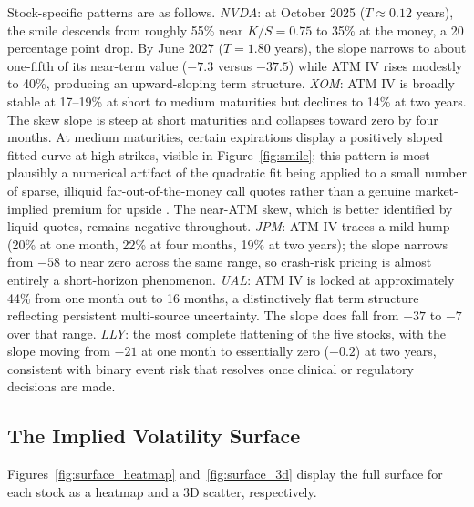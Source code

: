\documentclass[12pt, a4paper]{article}
\begin{document}
Stock-specific patterns are as follows. \textit{NVDA}: at October 2025 ($T \approx 0.12$
years), the smile descends from roughly 55\% near $K/S = 0.75$ to 35\% at the money, a
20 percentage point drop. By June 2027 ($T = 1.80$ years), the slope narrows to about
one-fifth of its near-term value ($-7.3$ versus $-37.5$) while ATM IV rises modestly to
40\%, producing an upward-sloping term structure. \textit{XOM}: ATM IV is broadly stable
at 17--19\% at short to medium maturities but declines to 14\% at two years. The skew
slope is steep at short maturities and collapses toward zero by four months. At medium
maturities, certain expirations display a positively sloped fitted curve at high strikes,
visible in Figure~\ref{fig:smile}; this pattern is most plausibly a numerical artifact
of the quadratic fit being applied to a small number of sparse, illiquid far-out-of-the-money
call quotes rather than a genuine market-implied premium for upside \citep{Jackwerth2000}.
The near-ATM skew, which is better identified by liquid quotes, remains negative throughout.
\textit{JPM}: ATM IV traces a mild hump (20\% at one month, 22\% at four months, 19\%
at two years); the slope narrows from $-58$ to near zero across the same range, so
crash-risk pricing is almost entirely a short-horizon phenomenon. \textit{UAL}: ATM IV
is locked at approximately 44\% from one month out to 16 months, a distinctively flat
term structure reflecting persistent multi-source uncertainty. The slope does fall from
$-37$ to $-7$ over that range. \textit{LLY}: the most complete flattening of the five
stocks, with the slope moving from $-21$ at one month to essentially zero ($-0.2$) at
two years, consistent with binary event risk that resolves once clinical or regulatory
decisions are made.

\subsection{The Implied Volatility Surface}

Figures~\ref{fig:surface_heatmap} and~\ref{fig:surface_3d} display the full surface for
each stock as a heatmap and a 3D scatter, respectively.
\end{document}
